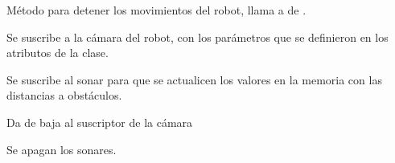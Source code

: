 
\begin{fulllineitems}
\label{\detokenize{nao_firebase:nao_robot.Robot.stop_movement}}
Método para detener los movimientos del robot, llama a 
de .

\end{fulllineitems}


\begin{fulllineitems}
\label{\detokenize{nao_firebase:nao_robot.Robot.subscribe_to_camera}}
Se suscribe a la cámara del robot, con los parámetros que se definieron
en los atributos de la clase.

\end{fulllineitems}


\begin{fulllineitems}
\label{\detokenize{nao_firebase:nao_robot.Robot.subscribe_to_sonar}}
Se suscribe al sonar para que se actualicen los valores en la memoria
con las distancias a obstáculos.

\end{fulllineitems}


\begin{fulllineitems}
\label{\detokenize{nao_firebase:nao_robot.Robot.unsubscribe_to_camera}}
Da de baja al suscriptor de la cámara

\end{fulllineitems}


\begin{fulllineitems}
\label{\detokenize{nao_firebase:nao_robot.Robot.unsubscribe_to_sonar}}
Se apagan los sonares.

\end{fulllineitems}




